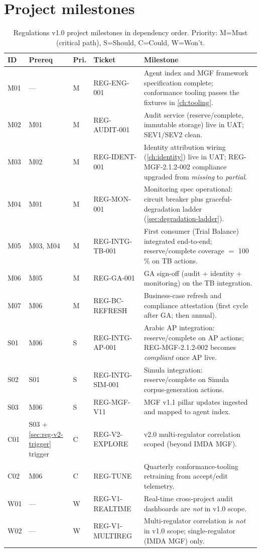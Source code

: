\section{Project milestones}\label{sec:reg-milestones}

\begin{table}[htbp]
\centering
\caption{Regulations v1.0 project milestones in dependency order.
Priority: M=Must (critical path), S=Should, C=Could, W=Won't.}
\label{tab:reg-milestones}
\footnotesize
\begin{tabularx}{\linewidth}{@{}l l l l X@{}}
\toprule
\textbf{ID} & \textbf{Prereq} & \textbf{Pri.} & \textbf{Ticket} & \textbf{Milestone} \\ \midrule
M01 & ---       & M & REG-ENG-001        & Agent index and MGF framework specification complete; conformance tooling passes the fixtures in \cref{ch:tooling}. \\
M02 & M01       & M & REG-AUDIT-001      & Audit service (reserve/complete, immutable storage) live in UAT; SEV1/SEV2 clean. \\
M03 & M02       & M & REG-IDENT-001      & Identity attribution wiring (\cref{ch:identity}) live in UAT; REG-MGF-2.1.2-002 compliance upgraded from \textit{missing} to \textit{partial}. \\
M04 & M01       & M & REG-MON-001        & Monitoring spec operational: circuit breaker plus graceful-degradation ladder (\cref{sec:degradation-ladder}). \\
M05 & M03, M04  & M & REG-INTG-TB-001    & First consumer (Trial Balance) integrated end-to-end; reserve/complete coverage $=$ 100\,\% on TB actions. \\
M06 & M05       & M & REG-GA-001         & GA sign-off (audit + identity + monitoring) on the TB integration. \\
M07 & M06       & M & REG-BC-REFRESH     & Business-case refresh and compliance attestation (first cycle after GA; then annual). \\
S01 & M06       & S & REG-INTG-AP-001    & Arabic AP integration: reserve/complete on AP actions; REG-MGF-2.1.2-002 becomes \textit{compliant} once AP live. \\
S02 & S01       & S & REG-INTG-SIM-001   & Simula integration: reserve/complete on Simula corpus-generation actions. \\
S03 & M06       & S & REG-MGF-V11        & MGF v1.1 pillar updates ingested and mapped to agent index. \\
C01 & S03 + \cref{sec:reg-v2-trigger} trigger & C & REG-V2-EXPLORE & v2.0 multi-regulator correlation scoped (beyond IMDA MGF). \\
C02 & M06       & C & REG-TUNE           & Quarterly conformance-tooling retraining from accept/edit telemetry. \\
W01 & ---       & W & REG-V1-REALTIME    & Real-time cross-project audit dashboards are \emph{not} in v1.0 scope. \\
W02 & ---       & W & REG-V1-MULTIREG    & Multi-regulator correlation is \emph{not} in v1.0 scope; single-regulator (IMDA MGF) only. \\
\bottomrule
\end{tabularx}
\end{table}

